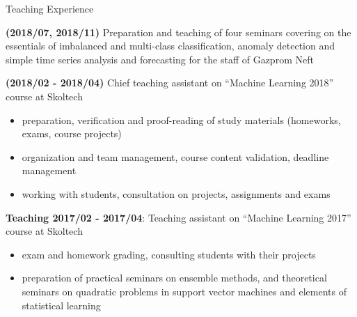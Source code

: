 \documentclass{resume} %
\begin{document}
\begin{rSection}{Teaching Experience}
    \item \textbf{(2018/07, 2018/11)} %
    Preparation and teaching of four seminars covering on the essentials of imbalanced and multi-class classification, anomaly detection and simple time series analysis and forecasting for the staff of Gazprom Neft

    \item \textbf{(2018/02 - 2018/04)}
    Chief teaching assistant on ``Machine Learning 2018'' course at Skoltech
    \begin{itemize}
        \item preparation, verification and proof-reading of study materials (homeworks, exams, course projects)
        
        \item organization and team management, course content validation, deadline management
        
        \item working with students, consultation on projects, assignments and exams
    \end{itemize}

    \item \textbf{Teaching 2017/02 - 2017/04}:
    Teaching assistant on ``Machine Learning 2017'' course at Skoltech
    \begin{itemize}
        \item exam and homework grading, consulting students with their projects

        \item preparation of practical seminars on ensemble methods, and theoretical seminars on quadratic problems in support vector machines and elements of statistical learning
    \end{itemize}
\end{rSection}
\end{document}
